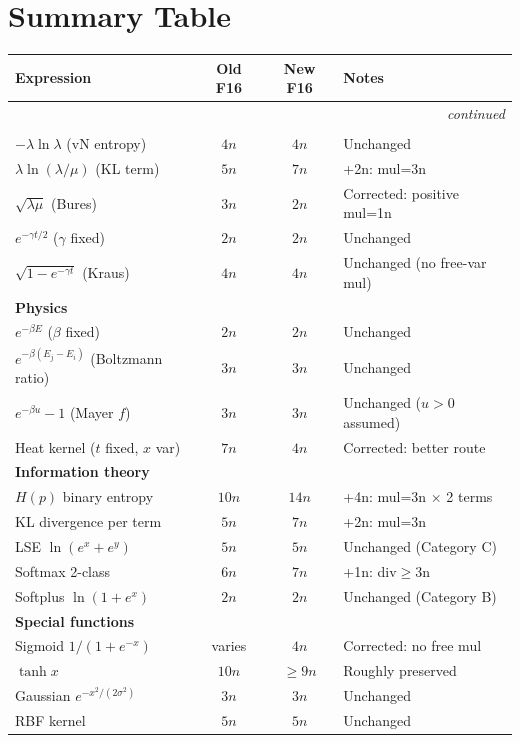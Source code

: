 \documentclass[11pt]{article}
\newcommand{\ok}[1]{\textcolor{ok}{#1}}
\newcommand{\flag}[1]{\textcolor{flag}{#1}}
\begin{document}
\section{Summary Table}

\begin{longtable}{p{4.5cm}ccp{4.5cm}}
\toprule
Expression & Old F16 & New F16 & Notes \\
\midrule
\endhead
\midrule
\multicolumn{4}{r}{\textit{continued}} \\
\endfoot
\bottomrule
\endlastfoot
\multicolumn{4}{l}{\textbf{Quantum}} \\
$-\lambda\ln\lambda$ (vN entropy)       & $4n$ & $4n$ & \ok{Unchanged} \\
$\lambda\ln(\lambda/\mu)$ (KL term)     & $5n$ & $7n$ & \flag{+2n: mul=3n} \\
$\sqrt{\lambda\mu}$ (Bures)             & $3n$ & $2n$ & \ok{Corrected: positive mul=1n} \\
$e^{-\gamma t/2}$ ($\gamma$ fixed)      & $2n$ & $2n$ & \ok{Unchanged} \\
$\sqrt{1-e^{-\gamma t}}$ (Kraus)        & $4n$ & $4n$ & \ok{Unchanged (no free-var mul)} \\
\multicolumn{4}{l}{\textbf{Physics}} \\
$e^{-\beta E}$ ($\beta$ fixed)          & $2n$ & $2n$ & \ok{Unchanged} \\
$e^{-\beta(E_j-E_i)}$ (Boltzmann ratio) & $3n$ & $3n$ & \ok{Unchanged} \\
$e^{-\beta u}-1$ (Mayer $f$)            & $3n$ & $3n$ & \ok{Unchanged ($u>0$ assumed)} \\
Heat kernel ($t$ fixed, $x$ var)        & $7n$ & $4n$ & \ok{Corrected: better route} \\
\multicolumn{4}{l}{\textbf{Information theory}} \\
$H(p)$ binary entropy                   & $10n$ & $14n$ & \flag{+4n: mul=3n $\times$ 2 terms} \\
KL divergence per term                  & $5n$ & $7n$ & \flag{+2n: mul=3n} \\
LSE $\ln(e^x+e^y)$                     & $5n$ & $5n$ & \ok{Unchanged (Category C)} \\
Softmax 2-class                         & $6n$ & $7n$ & \flag{+1n: div$\geq$3n} \\
Softplus $\ln(1+e^x)$                  & $2n$ & $2n$ & \ok{Unchanged (Category B)} \\
\multicolumn{4}{l}{\textbf{Special functions}} \\
Sigmoid $1/(1+e^{-x})$                 & varies & $4n$ & \ok{Corrected: no free mul} \\
$\tanh x$                              & $10n$ & $\geq 9n$ & \ok{Roughly preserved} \\
Gaussian $e^{-x^2/(2\sigma^2)}$         & $3n$ & $3n$ & \ok{Unchanged} \\
RBF kernel                             & $5n$ & $5n$ & \ok{Unchanged} \\
\end{longtable}
\end{document}
